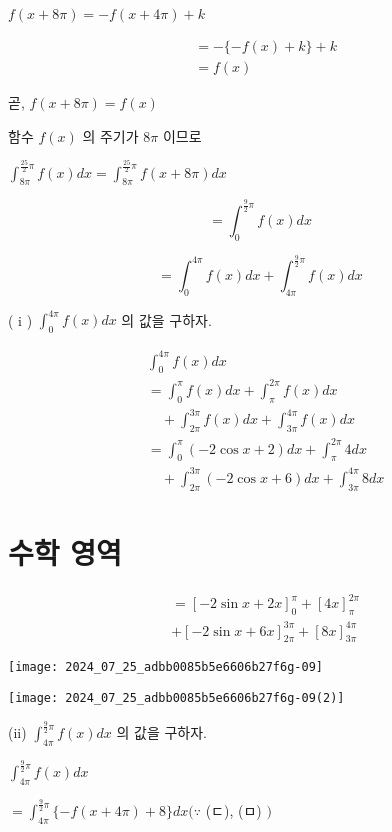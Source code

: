 \documentclass[10pt]{article}
\begin{document}
$f(x+8 \pi)=-f(x+4 \pi)+k$

\[
\begin{aligned}
& =-\{-f(x)+k\}+k \\
& =f(x)
\end{aligned}
\]

곧, $f(x+8 \pi)=f(x)$

함수 $f(x)$ 의 주기가 $8 \pi$ 이므로

$\int_{8 \pi}^{\frac{25}{2} \pi} f(x) d x=\int_{8 \pi}^{\frac{25}{2} \pi} f(x+8 \pi) d x$

\[
=\int_{0}^{\frac{9}{2} \pi} f(x) d x
\]

\[
=\int_{0}^{4 \pi} f(x) d x+\int_{4 \pi}^{\frac{9}{2} \pi} f(x) d x
\]

( i ) $\int_{0}^{4 \pi} f(x) d x$ 의 값을 구하자.

\[
\begin{aligned}
& \int_{0}^{4 \pi} f(x) d x \\
& =\int_{0}^{\pi} f(x) d x+\int_{\pi}^{2 \pi} f(x) d x \\
& \quad+\int_{2 \pi}^{3 \pi} f(x) d x+\int_{3 \pi}^{4 \pi} f(x) d x \\
& =\int_{0}^{\pi}(-2 \cos x+2) d x+\int_{\pi}^{2 \pi} 4 d x \\
& \quad+\int_{2 \pi}^{3 \pi}(-2 \cos x+6) d x+\int_{3 \pi}^{4 \pi} 8 d x
\end{aligned}
\]

\section*{수학 영역}
\[
\begin{aligned}
& =[-2 \sin x+2 x]_{0}^{\pi}+[4 x]_{\pi}^{2 \pi} \\
& +[-2 \sin x+6 x]_{2 \pi}^{3 \pi}+[8 x]_{3 \pi}^{4 \pi}
\end{aligned}
\]

\begin{center}
\texttt{[image: 2024\_07\_25\_adbb0085b5e6606b27f6g-09]}
\end{center}

\begin{center}
\texttt{[image: 2024\_07\_25\_adbb0085b5e6606b27f6g-09(2)]}
\end{center}

(ii) $\int_{4 \pi}^{\frac{9}{2} \pi} f(x) d x$ 의 값을 구하자.

$\int_{4 \pi}^{\frac{9}{2} \pi} f(x) d x$

$=\int_{4 \pi}^{\frac{9}{2} \pi}\{-f(x+4 \pi)+8\} d x(\because$ (ㄷ), (ㅁ) $)$
\end{document}
